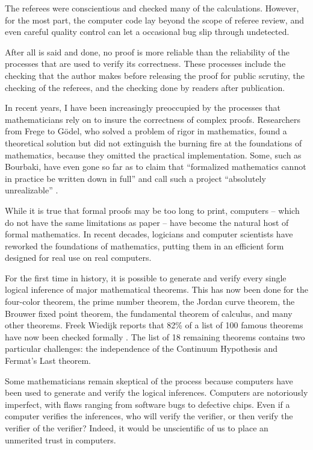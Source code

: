 The referees were conscientious and checked many of the calculations.
However, for the most part, the computer code lay beyond the scope of
referee review, and even careful quality control can let a
occasional bug slip through undetected.

After all is said and done, no proof is more reliable than the
reliability of the processes that are used to verify its
correctness.  These processes include the checking that the author
makes before releasing the proof for public scrutiny, the checking
of the referees, and the checking done by readers after publication.

In recent years, I have been increasingly preoccupied by the
processes that mathematicians rely on to insure the correctness of complex
proofs. Researchers from Frege to G\"odel, who solved a problem of
rigor in mathematics, found a theoretical solution but did not
extinguish the burning fire at the foundations of mathematics,
because they omitted the practical implementation. Some, such as
Bourbaki, have even gone so far as to claim that ``formalized
mathematics cannot in practice be written down in full'' and call
such a project
``absolutely unrealizable'' \cite[p 10,11]{Bour:68:Sets}. %

While it is true that formal proofs may be too long to print,
computers -- which do not have the same limitations as paper -- have
become the natural host of formal mathematics. In recent decades,
logicians and computer scientists have reworked the foundations of
mathematics, putting them in an efficient form designed for real use
on real computers.

For the first time in history, it is possible to generate and verify
every single logical inference of major mathematical theorems.  This
has now been done for the four-color theorem, the prime number
theorem, the Jordan curve theorem, the Brouwer fixed point theorem,
the fundamental theorem of calculus, and many other theorems.  Freek
Wiedijk reports that 82\% of a list of 100 famous theorems have now
been checked formally \cite{wiedijk:100}.  The list of 18 remaining
theorems contains two particular challenges: the independence of the
Continuum Hypothesis and Fermat's Last theorem.

Some mathematicians remain skeptical of the process because
computers have been used to generate and verify the logical
inferences.  Computers are notoriously imperfect, with flaws ranging
from software bugs to defective chips.  Even if a computer verifies
the inferences, who will verify the verifier, or then verify the
verifier of the verifier?  
Indeed, it would be unscientific of us to
place an unmerited trust in computers.

